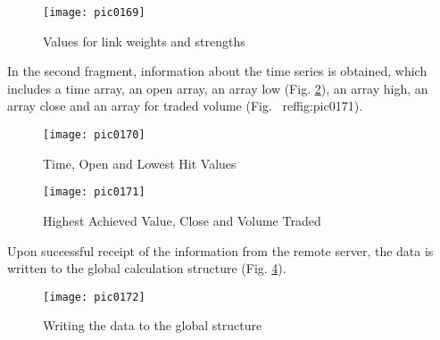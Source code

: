 \begin{figure}[h]
\centering
\texttt{[image: pic0169]}
\caption{Values for link weights and strengths}
\label{fig:pic0169}
\end{figure}
\FloatBarrier

In the second fragment, information about the time series is obtained, which includes a time array, an open array, an array low (Fig. \ref{fig:pic0170}), an array high, an array close and an array for traded volume (Fig. \ ref{fig:pic0171}).

\begin{figure}[h]
\centering
\texttt{[image: pic0170]}
\caption{Time, Open and Lowest Hit Values}
\label{fig:pic0170}
\end{figure}
\FloatBarrier

\begin{figure}[h]
\centering
\texttt{[image: pic0171]}
\caption{Highest Achieved Value, Close and Volume Traded}
\label{fig:pic0171}
\end{figure}
\FloatBarrier

Upon successful receipt of the information from the remote server, the data is written to the global calculation structure (Fig. \ref{fig:pic0172}).

\begin{figure}[h]
\centering
\texttt{[image: pic0172]}
\caption{Writing the data to the global structure}
\label{fig:pic0172}
\end{figure}
\FloatBarrier
